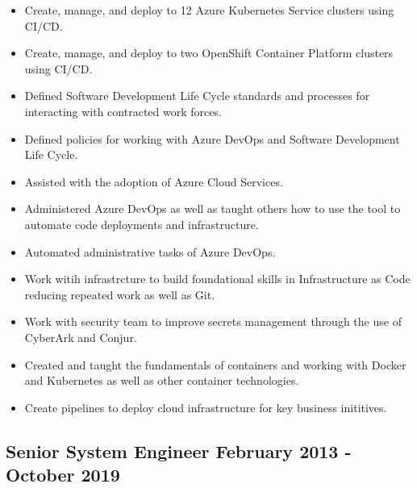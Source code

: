 \documentclass{article}
\begin{document}
        \begin{scriptsize}
        \begin{itemize}

          \item Create, manage, and deploy to 12 Azure Kubernetes Service
            clusters using CI/CD.

          \item Create, manage, and deploy to two OpenShift Container Platform
            clusters using CI/CD.

          \item Defined Software Development Life Cycle standards and processes
            for interacting with contracted work forces.

          \item Defined policies for working with Azure DevOps and Software
            Development Life Cycle.

          \item Assisted with the adoption of Azure Cloud Services.

          \item Administered Azure DevOps as well as taught others how to use
            the tool to automate code deployments and infrastructure.

          \item Automated administrative tasks of Azure DevOps.

          \item Work witih infrastrcture to build foundational skills in
            Infrastructure as Code reducing repeated work as well as Git.

          \item Work with security team to improve secrets management through
            the use of CyberArk and Conjur.

          \item Created and taught the fundamentals of containers and working
            with Docker and Kubernetes as well as other container technologies.

          \item Create pipelines to deploy cloud infrastructure for key
            business inititives.

        \end{itemize}
        \end{scriptsize}

    \subsection{Senior System Engineer {\hfill} February 2013 - October 2019}
\end{document}
